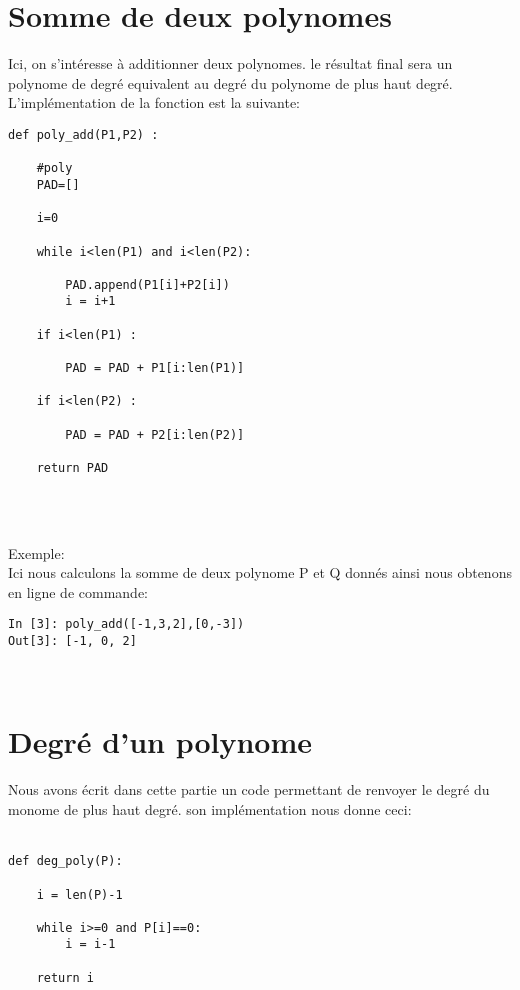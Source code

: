 \documentclass{exam}
\newenvironment{DDbox}[1]{
\begin{lrbox}{\BBbox}\begin{minipage}{\linewidth}}
{\end{minipage}\end{lrbox}\noindent\colorbox{Zgris}{\usebox{\BBbox}} \\
[.5cm]}
\begin{document}
\section{Somme de deux polynomes}
\indent Ici, on s'intéresse à additionner deux polynomes. le résultat final sera un polynome de degré equivalent au degré du polynome de plus haut degré. L'implémentation de la fonction est la suivante:\\
\begin{DDbox}{\linewidth}
\begin{Verbatim}
def poly_add(P1,P2) :
	
	#poly
	PAD=[]
	
	i=0
	
	while i<len(P1) and i<len(P2):
		
		PAD.append(P1[i]+P2[i])
		i = i+1
		
	if i<len(P1) :
	
		PAD = PAD + P1[i:len(P1)]
		
	if i<len(P2) :
	
		PAD = PAD + P2[i:len(P2)]
		
	return PAD
	
	 
\end{Verbatim}
\end{DDbox}
Exemple:\\
Ici nous calculons la somme de deux polynome P et Q donnés ainsi nous obtenons en ligne de commande:\\

\begin{DDbox}{\linewidth}
\begin{Verbatim}
In [3]: poly_add([-1,3,2],[0,-3])
Out[3]: [-1, 0, 2]
\end{Verbatim}
\end{DDbox}

\section{Degré d'un polynome}

\indent Nous avons écrit dans cette partie un code permettant de renvoyer le degré du monome de plus haut degré.
son implémentation nous donne ceci:\\\\
\begin{DDbox}{\linewidth}
\begin{Verbatim}
def deg_poly(P):
	
	i = len(P)-1
	
	while i>=0 and P[i]==0:
		i = i-1
		
	return i
	 
\end{Verbatim}
\end{DDbox}
\end{document}
